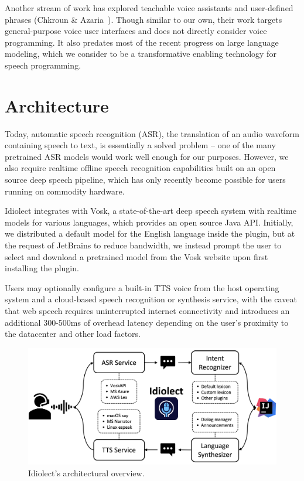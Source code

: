 \documentclass[conference]{IEEEtran}
\begin{document}
Another stream of work has explored teachable voice assistants and user-defined phrases (Chkroun \& Azaria~\cite{chkroun2019lia}). Though similar to our own, their work targets general-purpose voice user interfaces and does not directly consider voice programming. It also predates most of the recent progress on large language modeling, which we consider to be a transformative enabling technology for speech programming.

\section{Architecture}

Today, automatic speech recognition (ASR), the translation of an audio waveform containing speech to text, is essentially a solved problem -- one of the many pretrained ASR models would work well enough for our purposes. However, we also require realtime offline speech recognition capabilities built on an open source deep speech pipeline, which has only recently become possible for users running on commodity hardware.

Idiolect integrates with Vosk, a state-of-the-art deep speech system with realtime models for various languages, which provides an open source Java API. Initially, we distributed a default model for the English language inside the plugin, but at the request of JetBrains to reduce bandwidth, we instead prompt the user to select and download a pretrained model from the Vosk website upon first installing the plugin.


Users may optionally configure a built-in TTS voice from the host operating system and a cloud-based speech recognition or synthesis service, with the caveat that web speech requires uninterrupted internet connectivity and introduces an additional 300-500ms of overhead latency depending on the user's proximity to the datacenter and other load factors.

\begin{figure}[t]
    \centering
    \includegraphics[width=0.3\linewidth]{architecture.png}
    \caption{Idiolect's architectural overview.}
    \label{fig:architectural_overview}
\end{figure}
\end{document}
